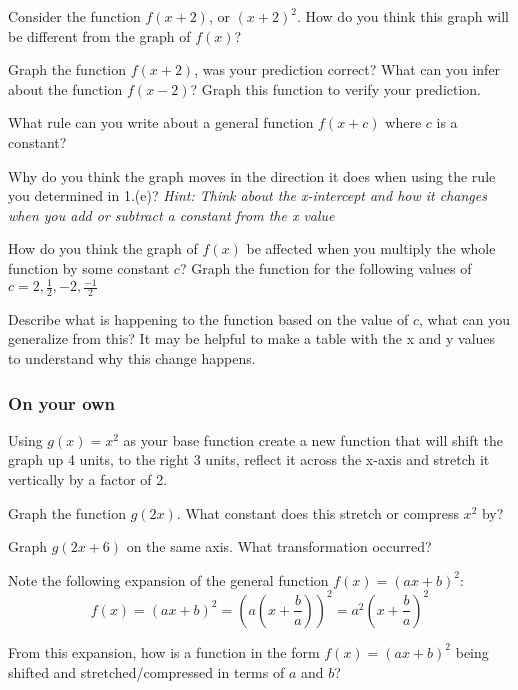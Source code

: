 \documentclass{ximera}
\begin{document}
Consider the function $f(x+2)$, or $(x+2)^2$. How do you think this graph will be different from the graph of $f(x)$?

Graph the function $f(x+2)$, was your prediction correct? What can you infer about the function $f(x-2)$? Graph this function to verify your prediction.

What rule can you write about a general function $f(x+c)$ where $c$ is a constant?

Why do you think the graph moves in the direction it does when using the rule you determined in 1.(e)? \textit{Hint: Think about the x-intercept and how it changes when you add or subtract a constant from the x value}

How do you think the graph of $f(x)$ be affected when you multiply the whole function by some constant $c$? Graph the function for the following values of $c=2,\frac{1}{2},-2,\frac{-1}{2}$

Describe what is happening to the function based on the value of $c$, what can you generalize from this? It may be helpful to make a table with the x and y values to understand why this change happens.

\subsubsection{On your own}

Using $g(x) = x^2$ as your base function create a new function that will shift the graph up 4 units, to the right 3 units, reflect it across the x-axis and stretch it vertically by a factor of 2.

Graph the function $g(2x)$. What constant does this stretch or compress $x^2$ by?

Graph $g(2x+6)$ on the same axis. What transformation occurred?

Note the following expansion of the general function $f(x)=(ax+b)^2$: $$\displaystyle f(x)=\left(ax+b\right)^2=\left(a\left(x+\frac{b}{a}\right)\right)^2=a^2\left(x+\frac{b}{a}\right)^2$$

From this expansion, how is a function in the form $f(x)=(ax+b)^2$ being shifted and stretched/compressed in terms of $a$ and $b$?
\end{document}
